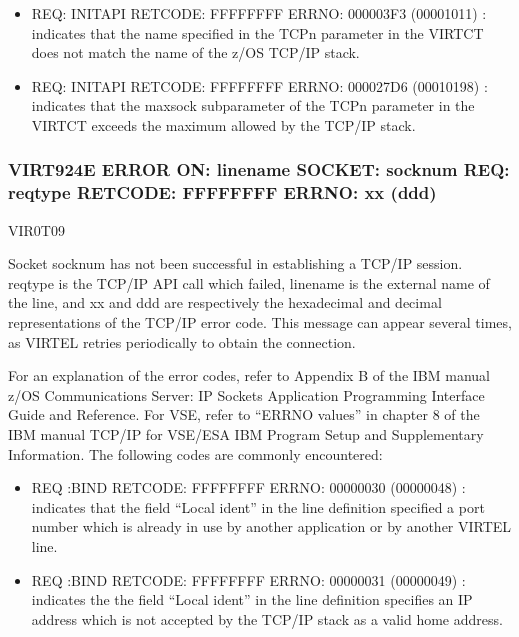 \documentclass[letterpaper,10pt,english]{sphinxmanual}
\begin{document}
\begin{description}
\begin{itemize}
\item {} 
\sphinxAtStartPar
REQ: INITAPI \sphinxhyphen{} RETCODE: FFFFFFFF ERRNO: 000003F3 (00001011) : indicates that the name specified in the TCPn parameter in the VIRTCT does not match the name of the z/OS TCP/IP stack.

\item {} 
\sphinxAtStartPar
REQ: INITAPI \sphinxhyphen{} RETCODE: FFFFFFFF ERRNO: 000027D6 (00010198) : indicates that the maxsock subparameter of the TCPn parameter in the VIRTCT exceeds the maximum allowed by the TCP/IP stack.

\end{itemize}

\end{description}


\subsubsection{VIRT924E ERROR ON: linename SOCKET: socknum REQ: reqtype \sphinxhyphen{} RETCODE: FFFFFFFF ERRNO: xx (ddd)}
\label{\detokenize{messages:virt924e-error-on-linename-socket-socknum-req-reqtype-retcode-ffffffff-errno-xx-ddd}}\begin{description}
\sphinxAtStartPar
VIR0T09

\sphinxAtStartPar
Socket socknum has not been successful in establishing a TCP/IP  session. reqtype is the TCP/IP  API call which  failed, linename is the external name of the line, and xx and ddd are respectively the hexadecimal and decimal representations of the TCP/IP error code. This message can appear several times, as VIRTEL retries periodically to obtain the connection.

\sphinxAtStartPar
For an explanation of the error codes, refer to Appendix B of the IBM manual z/OS Communications Server: IP Sockets Application Programming Interface Guide and Reference. For VSE, refer to “ERRNO values” in chapter 8 of the IBM manual TCP/IP for VSE/ESA IBM Program Setup and Supplementary Information.
The following codes are commonly encountered:
\begin{itemize}
\item {} 
\sphinxAtStartPar
REQ :BIND \sphinxhyphen{} RETCODE: FFFFFFFF ERRNO: 00000030 (00000048) : indicates that the field “Local ident” in the line definition specified a port number which is already in use by another application or by another VIRTEL line.

\item {} 
\sphinxAtStartPar
REQ :BIND \sphinxhyphen{} RETCODE: FFFFFFFF ERRNO: 00000031 (00000049) : indicates the the field “Local ident” in the line definition specifies an IP address which is not accepted by the TCP/IP stack as a valid home address.

\end{itemize}

\end{description}
\end{document}
